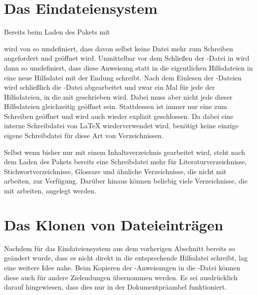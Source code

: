 \section{Das Eindateiensystem}

Bereits beim Laden des Pakets mit
\begin{lstcode}
  \usepackage{scrwfile}
\end{lstcode}
wird  von  so
umdefiniert, dass davon selbst keine Datei mehr zum Schreiben angefordert und
geöffnet wird. Unmittelbar vor dem Schließen der -Datei in
 wird dann  so umdefiniert,
dass diese Anweisung statt in die eigentlichen Hilfsdateien in eine neue
Hilfsdatei mit der Endung  schreibt. Nach dem Einlesen der
-Dateien wird schließlich die -Datei abgearbeitet und zwar
ein Mal für jede der Hilfsdateien, in die mit  geschrieben
wird. Dabei muss aber nicht jede dieser Hilfsdateien gleichzeitig
geöffnet sein. Stattdessen ist immer nur eine zum Schreiben geöffnet und wird
auch wieder explizit geschlossen. Da dabei eine interne Schreibdatei von
\LaTeX{} wiederverwendet wird, benötigt  keine einzige
eigene Schreibdatei für diese Art von Verzeichnissen.

Selbst wenn bisher nur mit einem Inhaltsverzeichnis gearbeitet wird, steht
nach dem Laden des Pakets bereits eine Schreibdatei mehr für
Literaturverzeichnisse, Stichwortverzeichnisse, Glossare und ähnliche
Verzeichnisse, die nicht mit  arbeiten, zur
Verfügung. Darüber hinaus können beliebig viele Verzeichnisse, die mit
 arbeiten, angelegt werden.%
%

\section{Das Klonen von Dateieinträgen}

Nachdem  für das Eindateiensystem aus
dem vorherigen Abschnitt bereits so geändert wurde, dass es nicht direkt in
die entsprechende Hilfsdatei schreibt, lag eine weitere Idee nahe. Beim
Kopieren der -Anweisungen in die -Datei können
diese auch für andere Zielendungen übernommen werden. Es sei ausdrücklich
darauf hingewiesen, dass dies nur in der Dokumentpräambel funktioniert.

